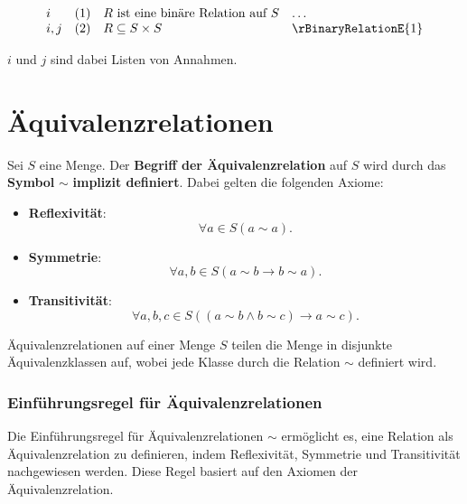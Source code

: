 \documentclass[main.tex]{subfiles}
\begin{document}
\[
\begin{array}{llll}
    i       & (1) & R \text{ ist eine binäre Relation auf } S & \dots \\
    i,j     & (2) & R \subseteq S \times S & \rBinaryRelationE{1}
\end{array}
\]

\(i\) und \(j\) sind dabei Listen von Annahmen.



\section{Äquivalenzrelationen}

\begin{definition}[Äquivalenzrelation]
    Sei \(S\) eine Menge. Der \textbf{Begriff der Äquivalenzrelation} auf \(S\) wird durch das \textbf{Symbol} \(\sim\) \textbf{implizit definiert}. Dabei gelten die folgenden Axiome:
    
    \begin{itemize}
        \item \textbf{Reflexivität}:
        \[
        \forall a \in S (a \sim a).
        \]
        
        \item \textbf{Symmetrie}: 
        \[
        \forall a, b \in S (a \sim b \rightarrow b \sim a).
        \]
        
        \item \textbf{Transitivität}: 
        \[
        \forall a, b, c \in S ((a \sim b \land b \sim c) \rightarrow a \sim c).
        \]
    \end{itemize}
\end{definition}

\begin{remark}
    Äquivalenzrelationen auf einer Menge \(S\) teilen die Menge in disjunkte Äquivalenzklassen auf, wobei jede Klasse durch die Relation \(\sim\) definiert wird.
\end{remark}

\subsubsection*{Einführungsregel für Äquivalenzrelationen}
\label{rule:rEquivalenceRelationI}
Die Einführungsregel für Äquivalenzrelationen \(\sim\) ermöglicht es, eine Relation als Äquivalenzrelation zu definieren, indem Reflexivität, Symmetrie und Transitivität nachgewiesen werden. Diese Regel basiert auf den Axiomen der Äquivalenzrelation.
\end{document}
